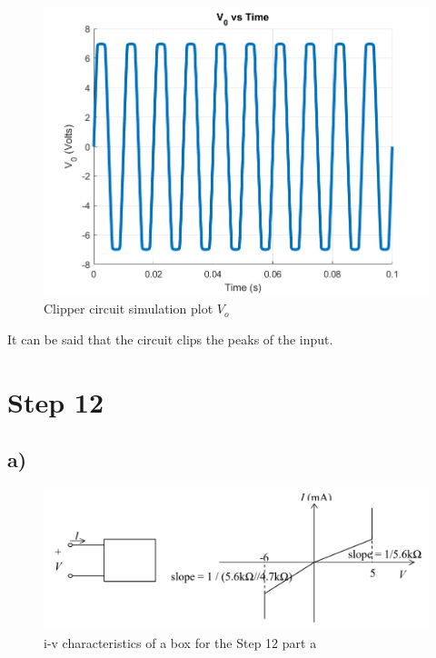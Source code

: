 \documentclass[letterpaper,12pt]{article}
\begin{document}
\begin{figure}[H]
    \centering
   \includegraphics[width=1\textwidth]{11.png}
   \caption{Clipper circuit simulation plot \(V_o\) }
\end{figure} 
It can be said that the circuit clips the peaks of the input.
\iffalse
\section{Step 12}

\subsection{a)}
\begin{figure}[H]
    \centering
   \includegraphics[width=1\textwidth]{12_1.png}
   \caption{i-v characteristics of a box for the Step 12 part a}
\end{figure} 
\end{document}
